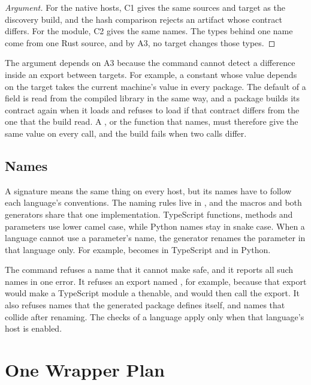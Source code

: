 \documentclass[sigconf,nonacm]{acmart}
\begin{document}
\begin{proof}[Argument]
For the native hosts, C1 gives the same sources and target as the discovery build, and the hash comparison rejects an artifact whose contract differs. For the module, C2 gives the same names. The types behind one name come from one Rust source, and by A3, no target changes those types.
\end{proof}

The argument depends on A3 because the command cannot detect a difference inside an export between targets. For example, a constant whose value depends on the target takes the current machine's value in every package. The default of a field is read from the compiled library in the same way, and a package builds its contract again when it loads and refuses to load if that contract differs from the one that the build read. A , or the function that \ttt{\#[serde(default = "path")]} names, must therefore give the same value on every call, and the build fails when two calls differ.

\subsection{Names}

A signature means the same thing on every host, but its names have to follow each language's conventions. The naming rules live in , and the macros and both generators share that one implementation. TypeScript functions, methods and parameters use lower camel case, while Python names stay in snake case. When a language cannot use a parameter's name, the generator renames the parameter in that language only. For example,  becomes  in TypeScript and  in Python.

The command refuses a name that it cannot make safe, and it reports all such names in one error. It refuses an export named , for example, because that export would make a TypeScript module a thenable, and  would then call the export. It also refuses names that the generated package defines itself, and names that collide after renaming. The checks of a language apply only when that language's host is enabled.

\section{One Wrapper Plan}
\label{sec:wrappers}
\end{document}
